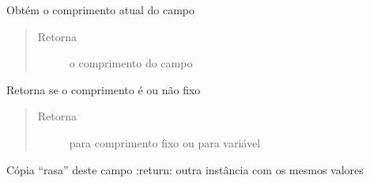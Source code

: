 \documentclass[letterpaper,10pt,brazil]{sphinxmanual}
\begin{document}
\begin{fulllineitems}
\begin{fulllineitems}
\label{\detokenize{estrutarq.campo:estrutarq.campo.campo_comum.CampoBasico.comprimento}}
\pysigstartsignatures
{}
\pysigstopsignatures
\sphinxAtStartPar
Obtém o comprimento atual do campo
\begin{quote}\begin{description}
\item[{Retorna}] \leavevmode
\sphinxAtStartPar
o comprimento do campo

\end{description}\end{quote}

\end{fulllineitems}


\begin{fulllineitems}
\label{\detokenize{estrutarq.campo:estrutarq.campo.campo_comum.CampoBasico.comprimento_fixo}}
\pysigstartsignatures
{}
\pysigstopsignatures
\sphinxAtStartPar
Retorna se o comprimento é ou não fixo
\begin{quote}\begin{description}
\item[{Retorna}] \leavevmode
\sphinxAtStartPar
{} para comprimento fixo ou  para variável

\end{description}\end{quote}

\end{fulllineitems}


\begin{fulllineitems}
\label{\detokenize{estrutarq.campo:estrutarq.campo.campo_comum.CampoBasico.copy}}
\pysigstartsignatures
{}
\pysigstopsignatures
\sphinxAtStartPar
Cópia “rasa” deste campo
:return: outra instância com os mesmos valores

\end{fulllineitems}


\end{fulllineitems}
\end{document}
